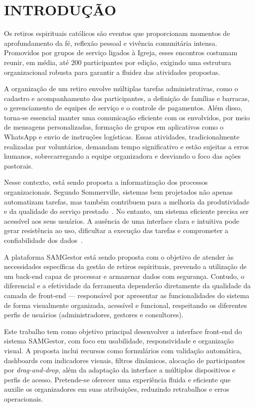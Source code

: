 \chapter{INTRODUÇÃO}

Os retiros espirituais católicos são eventos que proporcionam momentos de aprofundamento da fé, reflexão pessoal e vivência comunitária intensa. Promovidos por grupos de serviço ligados à Igreja, esses encontros costumam reunir, em média, até 200 participantes por edição, exigindo uma estrutura organizacional robusta para garantir a fluidez das atividades propostas.

A organização de um retiro envolve múltiplas tarefas administrativas, como o cadastro e acompanhamento dos participantes, a definição de famílias e barracas, o gerenciamento de equipes de serviço e o controle de pagamentos. Além disso, torna-se essencial manter uma comunicação eficiente com os envolvidos, por meio de mensagens personalizadas, formação de grupos em aplicativos como o WhatsApp e envio de instruções logísticas. Essas atividades, tradicionalmente realizadas por voluntários, demandam tempo significativo e estão sujeitas a erros humanos, sobrecarregando a equipe organizadora e desviando o foco das ações pastorais.

Nesse contexto, está sendo proposta a informatização dos processos organizacionais. Segundo Sommerville, sistemas bem projetados não apenas automatizam tarefas, mas também contribuem para a melhoria da produtividade e da qualidade do serviço prestado~\cite{sommerville2011}. No entanto, um sistema eficiente precisa ser acessível aos seus usuários. A ausência de uma interface clara e intuitiva pode gerar resistência ao uso, dificultar a execução das tarefas e comprometer a confiabilidade dos dados~\cite{preece2013design}.

A plataforma SAMGestor está sendo proposta com o objetivo de atender às necessidades específicas da gestão de retiros espirituais, prevendo a utilização de um back-end capaz de processar e armazenar dados com segurança. Contudo, o diferencial e a efetividade da ferramenta dependerão diretamente da qualidade da camada de front-end — responsável por apresentar as funcionalidades do sistema de forma visualmente organizada, acessível e funcional, respeitando os diferentes perfis de usuários (administradores, gestores e consultores).

Este trabalho tem como objetivo principal desenvolver a interface front-end do sistema SAMGestor, com foco em usabilidade, responsividade e organização visual. A proposta inclui recursos como formulários com validação automática, dashboards com indicadores visuais, filtros dinâmicos, alocação de participantes por \textit{drag-and-drop}, além da adaptação da interface a múltiplos dispositivos e perfis de acesso. Pretende-se oferecer uma experiência fluida e eficiente que auxilie os organizadores em suas atribuições, reduzindo retrabalhos e erros operacionais.

